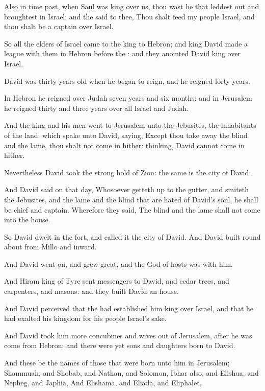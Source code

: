 \verse Also in time past, when Saul was king over us, thou wast he that leddest out and broughtest in Israel: and the \LORD said to thee, Thou shalt feed my people Israel, and thou shalt be a captain over Israel.

\verse So all the elders of Israel came to the king to Hebron; and king David made a league with them in Hebron before the \LORD: and they anointed David king over Israel.

\verse David was thirty years old when he began to reign, and he reigned forty years.

\verse In Hebron he reigned over Judah seven years and six months: and in Jerusalem he reigned thirty and three years over all Israel and Judah.

\verse And the king and his men went to Jerusalem unto the Jebusites, the inhabitants of the land: which spake unto David, saying, Except thou take away the blind and the lame, thou shalt not come in hither: thinking, David cannot come in hither.

\verse Nevertheless David took the strong hold of Zion: the same is the city of David.

\verse And David said on that day, Whosoever getteth up to the gutter, and smiteth the Jebusites, and the lame and the blind that are hated of David's soul, he shall be chief and captain. Wherefore they said, The blind and the lame shall not come into the house.

\verse So David dwelt in the fort, and called it the city of David. And David built round about from Millo and inward.

\verse And David went on, and grew great, and the \LORD God of hosts was with him.

\verse And Hiram king of Tyre sent messengers to David, and cedar trees, and carpenters, and masons: and they built David an house.

\verse And David perceived that the \LORD had established him king over Israel, and that he had exalted his kingdom for his people Israel's sake.

\verse And David took him more concubines and wives out of Jerusalem, after he was come from Hebron: and there were yet sons and daughters born to David.

\verse And these be the names of those that were born unto him in Jerusalem; Shammuah, and Shobab, and Nathan, and Solomon, \verse Ibhar also, and Elishua, and Nepheg, and Japhia, \verse And Elishama, and Eliada, and Eliphalet.

